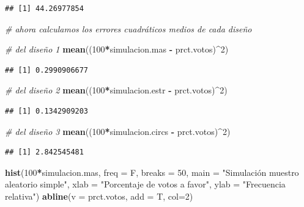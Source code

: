 \documentclass[
]{article}
\newenvironment{Shaded}{\begin{snugshade}}{\end{snugshade}}
\newcommand{\CommentTok}[1]{\textcolor[rgb]{0.56,0.35,0.01}{\textit{#1}}}
\newcommand{\DataTypeTok}[1]{\textcolor[rgb]{0.13,0.29,0.53}{#1}}
\newcommand{\DecValTok}[1]{\textcolor[rgb]{0.00,0.00,0.81}{#1}}
\newcommand{\KeywordTok}[1]{\textcolor[rgb]{0.13,0.29,0.53}{\textbf{#1}}}
\newcommand{\NormalTok}[1]{#1}
\newcommand{\OperatorTok}[1]{\textcolor[rgb]{0.81,0.36,0.00}{\textbf{#1}}}
\newcommand{\StringTok}[1]{\textcolor[rgb]{0.31,0.60,0.02}{#1}}
\begin{document}
\begin{verbatim}
## [1] 44.26977854
\end{verbatim}

\begin{Shaded}
\begin{Highlighting}[]
\CommentTok{# ahora calculamos los errores cuadráticos medios de cada diseño}

\CommentTok{# del diseño 1}
\KeywordTok{mean}\NormalTok{((}\DecValTok{100}\OperatorTok{*}\NormalTok{simulacion.mas }\OperatorTok{-}\StringTok{ }\NormalTok{prct.votos)}\OperatorTok{^}\DecValTok{2}\NormalTok{)}
\end{Highlighting}
\end{Shaded}

\begin{verbatim}
## [1] 0.2990906677
\end{verbatim}

\begin{Shaded}
\begin{Highlighting}[]
\CommentTok{# del diseño 2}
\KeywordTok{mean}\NormalTok{((}\DecValTok{100}\OperatorTok{*}\NormalTok{simulacion.estr }\OperatorTok{-}\StringTok{ }\NormalTok{prct.votos)}\OperatorTok{^}\DecValTok{2}\NormalTok{)}
\end{Highlighting}
\end{Shaded}

\begin{verbatim}
## [1] 0.1342909203
\end{verbatim}

\begin{Shaded}
\begin{Highlighting}[]
\CommentTok{# del diseño 3}
\KeywordTok{mean}\NormalTok{((}\DecValTok{100}\OperatorTok{*}\NormalTok{simulacion.circs }\OperatorTok{-}\StringTok{ }\NormalTok{prct.votos)}\OperatorTok{^}\DecValTok{2}\NormalTok{)}
\end{Highlighting}
\end{Shaded}

\begin{verbatim}
## [1] 2.842545481
\end{verbatim}

\begin{Shaded}
\begin{Highlighting}[]
\KeywordTok{hist}\NormalTok{(}\DecValTok{100}\OperatorTok{*}\NormalTok{simulacion.mas, }\DataTypeTok{freq =}\NormalTok{ F, }\DataTypeTok{breaks =} \DecValTok{50}\NormalTok{, }
     \DataTypeTok{main =} \StringTok{"Simulación muestro aleatorio simple"}\NormalTok{,}
     \DataTypeTok{xlab =} \StringTok{"Porcentaje de votos a favor"}\NormalTok{, }\DataTypeTok{ylab =} \StringTok{"Frecuencia relativa"}\NormalTok{)}
\KeywordTok{abline}\NormalTok{(}\DataTypeTok{v =}\NormalTok{ prct.votos, }\DataTypeTok{add =}\NormalTok{ T, }\DataTypeTok{col=}\DecValTok{2}\NormalTok{)}
\end{Highlighting}
\end{Shaded}
\end{document}
